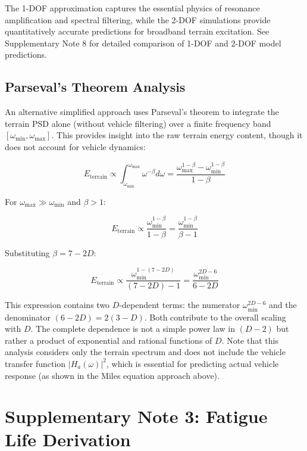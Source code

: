 \documentclass[11pt]{article}
\begin{document}
The 1-DOF approximation captures the essential physics of resonance amplification and spectral filtering, while the 2-DOF simulations provide quantitatively accurate predictions for broadband terrain excitation. See Supplementary Note 8 for detailed comparison of 1-DOF and 2-DOF model predictions.


\subsection{Parseval's Theorem Analysis}

An alternative simplified approach uses Parseval's theorem to integrate the terrain PSD alone (without vehicle filtering) over a finite frequency band $[\omega_{\min}, \omega_{\max}]$. This provides insight into the raw terrain energy content, though it does not account for vehicle dynamics:

\begin{equation}
E_{\text{terrain}} \propto \int_{\omega_{\min}}^{\omega_{\max}} \omega^{-\beta} d\omega = \frac{\omega_{\max}^{1-\beta} - \omega_{\min}^{1-\beta}}{1-\beta}
\end{equation}

For $\omega_{\max} \gg \omega_{\min}$ and $\beta > 1$:

\begin{equation}
E_{\text{terrain}} \propto \frac{\omega_{\min}^{1-\beta}}{1-\beta} = \frac{\omega_{\min}^{1-\beta}}{\beta-1}
\end{equation}

Substituting $\beta = 7-2D$:

\begin{equation}
E_{\text{terrain}} \propto \frac{\omega_{\min}^{1-(7-2D)}}{(7-2D)-1} = \frac{\omega_{\min}^{2D-6}}{6-2D}
\end{equation}

This expression contains two $D$-dependent terms: the numerator $\omega_{\min}^{2D-6}$ and the denominator $(6-2D) = 2(3-D)$. Both contribute to the overall scaling with $D$. The complete dependence is not a simple power law in $(D-2)$ but rather a product of exponential and rational functions of $D$. Note that this analysis considers only the terrain spectrum and does not include the vehicle transfer function $|H_a(\omega)|^2$, which is essential for predicting actual vehicle response (as shown in the Miles equation approach above).

\section{Supplementary Note 3: Fatigue Life Derivation}
\end{document}
